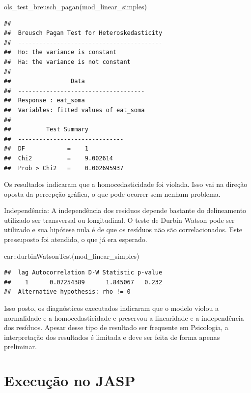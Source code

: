 \documentclass[
]{book}
\newenvironment{Shaded}{\begin{snugshade}}{\end{snugshade}}
\newcommand{\FunctionTok}[1]{\textcolor[rgb]{0.00,0.00,0.00}{#1}}
\newcommand{\NormalTok}[1]{#1}
\newcommand{\SpecialCharTok}[1]{\textcolor[rgb]{0.00,0.00,0.00}{#1}}
\begin{document}
\begin{Shaded}
\begin{Highlighting}[]
\FunctionTok{ols\_test\_breusch\_pagan}\NormalTok{(mod\_linear\_simples)}
\end{Highlighting}
\end{Shaded}

\begin{verbatim}
## 
##  Breusch Pagan Test for Heteroskedasticity
##  -----------------------------------------
##  Ho: the variance is constant            
##  Ha: the variance is not constant        
## 
##                 Data                 
##  ------------------------------------
##  Response : eat_soma 
##  Variables: fitted values of eat_soma 
## 
##          Test Summary          
##  ------------------------------
##  DF            =    1 
##  Chi2          =    9.002614 
##  Prob > Chi2   =    0.002695937
\end{verbatim}

Os resultados indicaram que a homocedasticidade foi violada. Isso vai na direção oposta da percepção gráfica, o que pode ocorrer sem nenhum problema.

Independência: A independência dos resíduos depende bastante do delineamento utilizado ser transversal ou longitudinal. O teste de Durbin Watson pode ser utilizado e sua hipótese nula é de que os resíduos não são correlacionados. Este pressuposto foi atendido, o que já era esperado.

\begin{Shaded}
\begin{Highlighting}[]
\NormalTok{car}\SpecialCharTok{::}\FunctionTok{durbinWatsonTest}\NormalTok{(mod\_linear\_simples)}
\end{Highlighting}
\end{Shaded}

\begin{verbatim}
##  lag Autocorrelation D-W Statistic p-value
##    1      0.07254389      1.845067   0.232
##  Alternative hypothesis: rho != 0
\end{verbatim}

Isso posto, os diagnósticos executados indicaram que o modelo violou a normalidade e a homocedasticidade e preservou a linearidade e a independência dos resíduos. Apesar desse tipo de resultado ser frequente em Psicologia, a interpretação dos resultados é limitada e deve ser feita de forma apenas preliminar.

\hypertarget{execuuxe7uxe3o-no-jasp-15}{%
\section{Execução no JASP}\label{execuuxe7uxe3o-no-jasp-15}}
\end{document}
